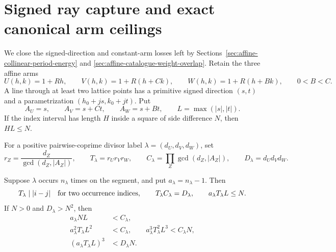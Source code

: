 \section{Signed ray capture and exact canonical arm ceilings}
\label{sec:affine-signed-ray-canonical-caps}

We close the signed-direction and constant-arm losses left by
Sections~\ref{sec:affine-collinear-period-energy} and
\ref{sec:affine-catalogue-weight-overlap}.  Retain the three affine arms
\[
 U(h,k)=1+Rh,\qquad
 V(h,k)=1+R(h+Ck),\qquad
 W(h,k)=1+R(h+Bk),\qquad 0<B<C.
\]
A line through at least two lattice points has a primitive signed direction
$(s,t)$ and a parametrization $(h_0+js,k_0+jt)$.  Put
\begin{equation}\label{eq:affine-signed-coefficients}
 A_U=s,\qquad A_V=s+Ct,\qquad A_W=s+Bt,\qquad
 L=\max(|s|,|t|).
\end{equation}
If the index interval has length $H$ inside a square of side difference $N$,
then $HL\le N$.

For a positive pairwise-coprime divisor label
$\lambda=(d_U,d_V,d_W)$, set
\begin{equation}\label{eq:affine-signed-period-capture}
 r_Z=\frac{d_Z}{\gcd(d_Z,|A_Z|)},\qquad
 T_\lambda=r_Ur_Vr_W,\qquad
 C_\lambda=\prod_Z\gcd(d_Z,|A_Z|),\qquad
 D_\lambda=d_Ud_Vd_W.
\end{equation}

\begin{theorem}
\label{thm:affine-signed-capture-squeeze}
Suppose $\lambda$ occurs $n_\lambda$ times on the segment, and put
$a_\lambda=n_\lambda-1$.  Then
\begin{equation}\label{eq:affine-period-capacity}
 T_\lambda\mid |i-j|\quad\hbox{for two occurrence indices},\qquad
 T_\lambda C_\lambda=D_\lambda,\qquad
 a_\lambda T_\lambda L\le N.
\end{equation}
If $N>0$ and $D_\lambda>N^2$, then
\begin{align}
 a_\lambda NL&<C_\lambda,
 \label{eq:affine-linear-capture-squeeze}\\
 a_\lambda^2T_\lambda L^2&<C_\lambda,\qquad
 a_\lambda^3T_\lambda^2L^3<C_\lambda N,
 \label{eq:affine-higher-capture-squeeze}\\
 (a_\lambda T_\lambda L)^3&<D_\lambda N.
 \label{eq:affine-physical-period-cube}
\end{align}
\end{theorem}

